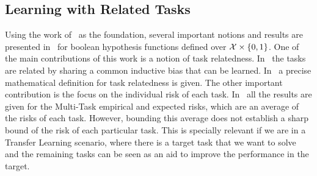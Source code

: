 
\subsection{Learning with Related Tasks} %
Using the work of~\cite{baxter2000model} as the foundation, several important notions and results are presented in~\cite{Ben-DavidB08} for boolean hypothesis functions defined over $\mathcal{X} \times \left\{0, 1\right\}$.
One of the main contributions of this work is a notion of task relatedness. In~\cite{baxter2000model} the tasks are related by sharing a common inductive bias that can be learned. In~\cite{Ben-DavidB08} a precise mathematical definition for task relatedness is given.
The other important contribution is the focus on the individual risk of each task. In~\cite{baxter2000model} all the results are given for the Multi-Task empirical and expected risks, which are an average of the risks of each task. However, bounding this average does not establish a sharp bound of the risk of each particular task. This is specially relevant if we are in a Transfer Learning scenario, where there is a target task that we want to solve and the remaining tasks can be seen as an aid to improve the performance in the target.

